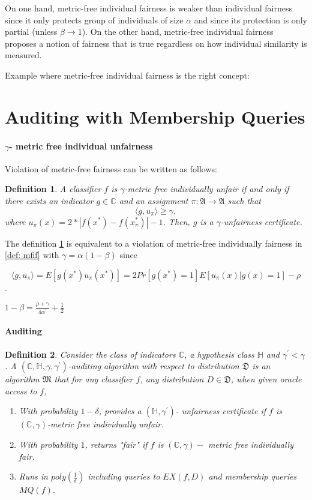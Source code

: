 \documentclass{article}
\newtheorem{defn}{Definition}[section]
\begin{document}
On one hand, metric-free individual fairness is weaker than individual fairness since it only protects group of individuals of size $\alpha$ and since its protection is only partial (unless $\beta \rightarrow 1$). On the other hand, metric-free individual fairness proposes a notion of fairness that is true regardless on how individual similarity is measured. 

\bigskip
Example where metric-free individual fairness is the right concept: 


\section{Auditing with Membership Queries}

\paragraph{$\gamma$- metric free individual unfairness}
Violation of metric-free fairness can be written as follows:

\begin{defn}
\label{def: unfair}
A classifier $f$ is $\gamma$-metric free individually unfair if and only if there exists an indicator $g\in \mathbb{C}$  and an assignment $\pi:\mathfrak{A} \rightarrow \mathfrak{A}$ such that
$$\langle g, u_{\pi}\rangle \geq \gamma,$$
where $u_{\pi}(x)=2*|f(x^{*})-f(x_{\pi}^{*})| - 1$. Then, $g$ is a $\gamma$-unfairness certificate. 
\end{defn}
The definition \ref{def: unfair} is equivalent to a violation of metric-free individually fairness in \ref{def: mfif} with $\gamma=\alpha (1-\beta)$ since 

$$ \langle g, u_{\pi} \rangle= E[g(x^{*})u_{\pi}(x^{*})] = 2Pr[g(x^{*})=1]E[u_{\pi}(x)|g(x)=1] - \rho$$.

$1-\beta=\frac{\rho + \gamma}{4\alpha^{'}}+ \frac{1}{2}$
\paragraph{Auditing}

\begin{defn}
Consider the class of indicators $\mathbb{C}$, a hypothesis class $\mathbb{H}$ and $\gamma^{'} < \gamma$. A $(\mathbb{C}, \mathbb{H}, \gamma, \gamma^{'})$-auditing algorithm with respect to distribution $\mathfrak{D}$ is an algorithm $\mathfrak{M}$ that for any classifier $f$, any distribution $D\in \mathfrak{D}$, when given oracle access to $f$, 
\begin{enumerate}
    \item With probability $1-\delta$, provides a $(\mathbb{H}, \gamma^{'})$- unfairness certificate if $f$ is $(\mathbb{C}, \gamma)$-metric free individually unfair.
    \item With probability $1$, returns "fair" if $f$ is $(\mathbb{C}, \gamma)-$ metric free individually fair.
    \item Runs in $poly(\frac{1}{\delta})$ including queries to $EX(f, D)$ and membership queries $MQ(f)$.
\end{enumerate} 
\end{defn}
\end{document}
